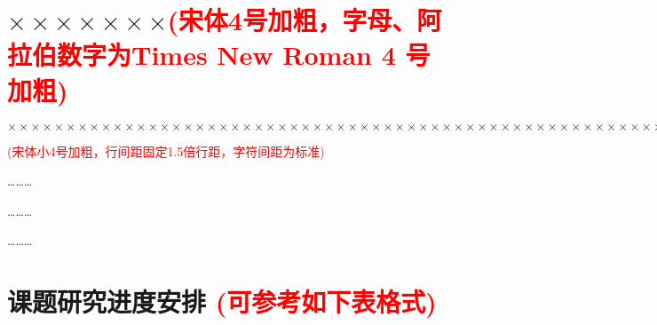\documentclass[11pt,a4paper]{article}
\newcommand{\xiaosihao}{\fontsize{12pt}{24pt}\selectfont}
\newcommand{\wuhao}{\fontsize{10.5pt}{18pt}\selectfont}
\newcommand\seccontent{
	\xiaosihao %
    \setlength{\parindent}{2em} %
    \setlength{\parskip}{0pt}
   }
\theoremstyle{definition}
\numberwithin{equation}{section}
\begin{document}
\section{$\times\times\times\times\times\times\times${\wuhao  \textcolor{red}{(宋体4号加粗，字母、阿拉伯数字为Times New Roman 4 号 加粗)}}}	\seccontent
$ \times\times\times\times\times\times\times\times\times\times\times\times\times\times\times\times\times\times\times\times\times\times\times\times\times\times\times\times\times\times\times\times\times\times\times\times\times\times\times\times\times\times\times\times\times\times\times\times\times\times\times\times\times\times\times\times\times\times\times\times\times\times\times\times\times\times\times\times\times\times\times\times\times\times\times\times\times\times\times\times\times\times\times\times\times\times\times\times\times\times\times\times\times\times\times\times\times\times\times\times\times\times\times\times\times\times\times\times\times\times\times\times\times\times\times\times\times\times\times\times\times\times\times\times\times\times\times\times\times\times\times\times\times\times\times\times\times\times\times\times\times\times\times\times\times\times\times\times\times\times\times\times\times\times\times\times\times\times\times\times\times\times\times\times\times\times\times\times\times\times\times\times\times\times\times\times\times\times\times\times\times\times\times\times\times\times\times $

{\wuhao  \textcolor{red}{(宋体小4号加粗，行间距固定1.5倍行距，字符间距为标准)}}

\hspace{15em} \ldots\ldots\ldots

\hspace{15em} \ldots\ldots\ldots

\hspace{15em} \ldots\ldots\ldots










\section{课题研究进度安排 {\wuhao  \textcolor{red}{(可参考如下表格式)}}}
\end{document}
